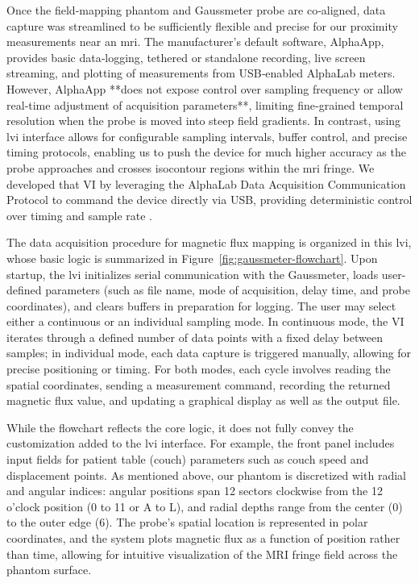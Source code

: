 Once the field‑mapping phantom and Gaussmeter probe are co‑aligned, data capture was streamlined to be sufficiently flexible and precise for our proximity measurements near an \gls{mri}. The manufacturer’s default software, AlphaApp, provides basic data‑logging, tethered or standalone recording, live screen streaming, and plotting of measurements from USB‑enabled AlphaLab meters\cite{AlphaApp}. However, AlphaApp **does not expose control over sampling frequency or allow real‑time adjustment of acquisition parameters**, limiting fine‑grained temporal resolution when the probe is moved into steep field gradients. In contrast, using \gls{lvi} interface allows for configurable sampling intervals, buffer control, and precise timing protocols, enabling us to push the device for much higher accuracy as the probe approaches and crosses isocontour regions within the \gls{mri} fringe. We developed that VI by leveraging the AlphaLab Data Acquisition Communication Protocol to command the device directly via USB, providing deterministic control over timing and sample rate \cite{AlphaAppProtocol}.

The data acquisition procedure for magnetic flux mapping is organized in this \gls{lvi}, whose basic logic is summarized in Figure~\ref{fig:gaussmeter-flowchart}. Upon startup, the \gls{lvi} initializes serial communication with the Gaussmeter, loads user-defined parameters (such as file name, mode of acquisition, delay time, and probe coordinates), and clears buffers in preparation for logging. The user may select either a continuous or an individual sampling mode. In continuous mode, the VI iterates through a defined number of data points with a fixed delay between samples; in individual mode, each data capture is triggered manually, allowing for precise positioning or timing. For both modes, each cycle involves reading the spatial coordinates, sending a measurement command, recording the returned magnetic flux value, and updating a graphical display as well as the output file.

While the flowchart reflects the core logic, it does not fully convey the customization added to the \gls{lvi} interface. For example, the front panel includes input fields for patient table (couch) parameters such as couch speed and displacement points. As mentioned above, our phantom is discretized with radial and angular indices: angular positions span 12 sectors clockwise from the 12 o’clock position (0 to 11 or A to L), and radial depths range from the center (0) to the outer edge (6). The probe’s spatial location is represented in polar coordinates, and the system plots magnetic flux as a function of position rather than time, allowing for intuitive visualization of the MRI fringe field across the phantom surface.

